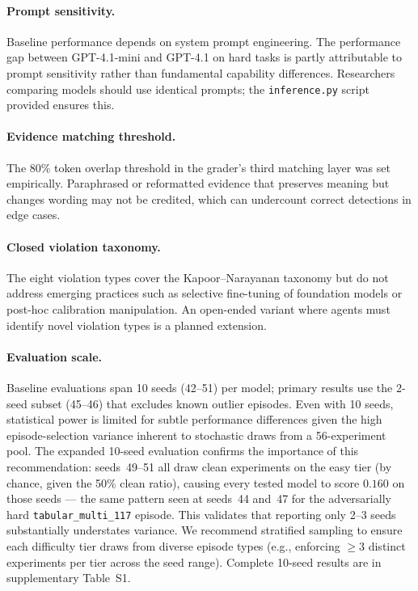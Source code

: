 \documentclass{article}
\begin{document}
\paragraph{Prompt sensitivity.}
Baseline performance depends on system prompt engineering.
The performance gap between GPT-4.1-mini and GPT-4.1 on hard tasks is partly attributable to prompt sensitivity rather than fundamental capability differences.
Researchers comparing models should use identical prompts; the \texttt{inference.py} script provided ensures this.

\paragraph{Evidence matching threshold.}
The 80\% token overlap threshold in the grader's third matching layer was set empirically.
Paraphrased or reformatted evidence that preserves meaning but changes wording may not be credited, which can undercount correct detections in edge cases.

\paragraph{Closed violation taxonomy.}
The eight violation types cover the Kapoor--Narayanan taxonomy but do not address emerging practices such as selective fine-tuning of foundation models or post-hoc calibration manipulation.
An open-ended variant where agents must identify novel violation types is a planned extension.

\paragraph{Evaluation scale.}
Baseline evaluations span 10 seeds (42--51) per model; primary results use the 2-seed
subset (45--46) that excludes known outlier episodes.
Even with 10 seeds, statistical power is limited for subtle performance differences
given the high episode-selection variance inherent to stochastic draws from a 56-experiment pool.
The expanded 10-seed evaluation confirms the importance of this recommendation: seeds~49--51
all draw clean experiments on the easy tier (by chance, given the 50\% clean ratio), causing
every tested model to score $0.160$ on those seeds — the same pattern seen at seeds~44 and~47
for the adversarially hard \texttt{tabular\_multi\_117} episode.
This validates that reporting only 2--3 seeds substantially understates variance.
We recommend stratified sampling to ensure each difficulty tier draws from diverse episode
types (e.g., enforcing $\geq3$ distinct experiments per tier across the seed range).
Complete 10-seed results are in supplementary Table~S1.
\end{document}
